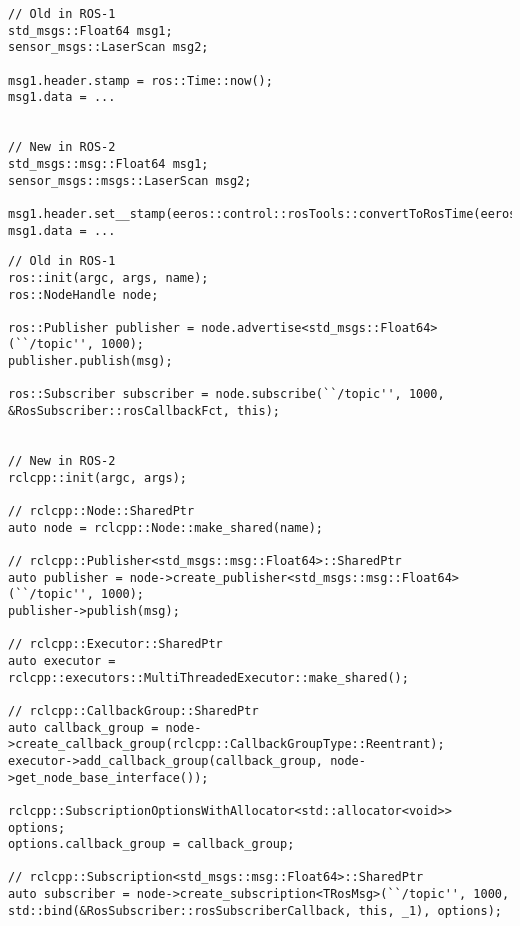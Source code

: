 \lstset{language=[ISO]C++}
\begin{lstlisting}[label=code:cpp-api-messages, caption={[Messages]Messages in ROS-2 are more Object-Oriented and are located in the namespace \textit{msg}.}]
// Old in ROS-1
std_msgs::Float64 msg1;
sensor_msgs::LaserScan msg2;

msg1.header.stamp = ros::Time::now();
msg1.data = ...


// New in ROS-2
std_msgs::msg::Float64 msg1;
sensor_msgs::msgs::LaserScan msg2;

msg1.header.set__stamp(eeros::control::rosTools::convertToRosTime(eeros::System::getTimeNs()));
msg1.data = ...
\end{lstlisting}


\lstset{language=[ISO]C++}
\begin{lstlisting}[label=code:cpp-api-modes, caption={[Nodes, Subscriptions, Publisher]The base of subscriptions, pulishers, callback-groups, ... are Nodes. Each Object also has a ::SharedPtr type, which should be used instead of a reference or a manually handled pointer.}]
// Old in ROS-1
ros::init(argc, args, name);
ros::NodeHandle node;

ros::Publisher publisher = node.advertise<std_msgs::Float64>(``/topic'', 1000);
publisher.publish(msg);

ros::Subscriber subscriber = node.subscribe(``/topic'', 1000, &RosSubscriber::rosCallbackFct, this);


// New in ROS-2
rclcpp::init(argc, args);

// rclcpp::Node::SharedPtr
auto node = rclcpp::Node::make_shared(name);

// rclcpp::Publisher<std_msgs::msg::Float64>::SharedPtr
auto publisher = node->create_publisher<std_msgs::msg::Float64>(``/topic'', 1000);
publisher->publish(msg);

// rclcpp::Executor::SharedPtr
auto executor = rclcpp::executors::MultiThreadedExecutor::make_shared();

// rclcpp::CallbackGroup::SharedPtr
auto callback_group = node->create_callback_group(rclcpp::CallbackGroupType::Reentrant);
executor->add_callback_group(callback_group, node->get_node_base_interface());

rclcpp::SubscriptionOptionsWithAllocator<std::allocator<void>> options;
options.callback_group = callback_group;

// rclcpp::Subscription<std_msgs::msg::Float64>::SharedPtr
auto subscriber = node->create_subscription<TRosMsg>(``/topic'', 1000, std::bind(&RosSubscriber::rosSubscriberCallback, this, _1), options);
\end{lstlisting}




